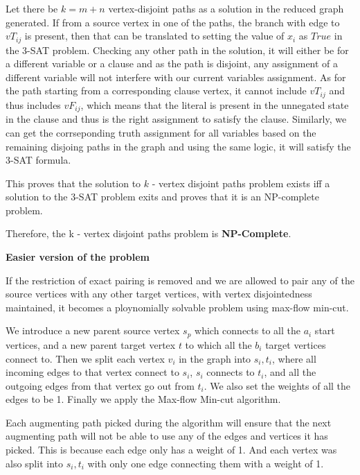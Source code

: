 \documentclass{imports}
\begin{document}
    Let there be $k = m+n$ vertex-disjoint paths as a solution in the reduced graph generated. If from a source vertex in one of the paths, the branch with edge to $vT_{ij}$ is present, then that can be translated to setting the value of $x_i$ as $True$ in the 3-SAT problem. Checking any other path in the solution, it will either be for a different variable or a clause and as the path is disjoint, any assignment of a different variable will not interfere with our current variables assignment. As for the path starting from a corresponding clause vertex, it cannot include $vT_{ij}$ and thus includes $vF_{ij}$, which means that the literal is present in the unnegated state in the clause and thus is the right assignment to satisfy the clause. Similarly, we can get the corrseponding truth assignment for all variables based on the remaining disjoing paths in the graph and using the same logic, it will satisfy the 3-SAT formula. \vspace{10pt}
 
    This proves that the solution to $k$ - vertex disjoint paths problem exists iff a solution to the 3-SAT problem exits and proves that it is an NP-complete problem. \vspace{10pt}

    Therefore, the k - vertex disjoint paths problem is \textbf{NP-Complete}. \vspace{10pt}


    \textbf{Easier version of the problem} \vspace{10pt}

    If the restriction of exact pairing is removed and we are allowed to pair any of the source vertices with any other target vertices,
    with vertex disjointedness maintained, it becomes a ploynomially solvable problem using max-flow min-cut. \vspace{10pt}

    We introduce a new parent source vertex $s_p$ which connects to all the $a_i$ start vertices, and a new parent target vertex $t$ 
    to which all the $b_i$ target vertices connect to. Then we split each vertex $v_i$ in the graph into $s_i, t_i$, where all incoming edges
    to that vertex connect to $s_i$, $s_i$ connects to $t_i$, and all the outgoing edges from that vertex go out from $t_i$.
    We also set the weights of all the edges to be 1. Finally we apply the Max-flow Min-cut algorithm. \vspace{10pt}
    
    Each augmenting path picked during the algorithm will ensure that the next augmenting path will not be able to use any of the edges and 
    vertices it has picked. This is because each edge only has a weight of 1. And each vertex was also split into $s_i, t_i$ with only one edge connecting
    them with a weight of 1. \vspace{10pt}
    
\end{document}
